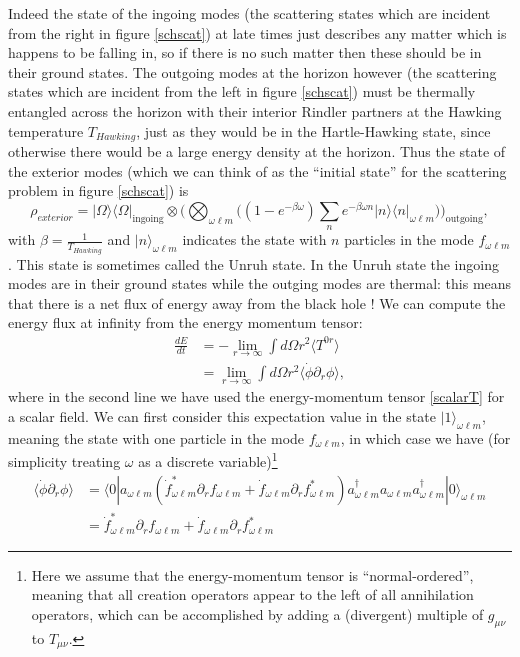 \documentclass[12pt]{article}
\newcommand{\be}{\begin{equation}}
\newcommand{\ee}{\end{equation}}
\newcommand{\lan}{\langle}
\newcommand{\ran}{\rangle}
\begin{document}
Indeed the state of the ingoing modes (the scattering states which are incident from the right in figure \ref{schscat}) at late times just describes any matter which is happens to be falling in, so if there is no such matter then these should be in their ground states.  The outgoing modes at the horizon however (the scattering states which are incident from the left in figure \ref{schscat}) must be thermally entangled across the horizon with their interior Rindler partners at the Hawking temperature $T_{\mathit{Hawking}}$, just as they would be in the Hartle-Hawking state, since otherwise there would be a large energy density at the horizon.  Thus the state of the exterior modes (which we can think of as the ``initial state'' for the scattering problem in figure \ref{schscat}) is
\be\label{BHmodestate}
\rho_{\mathit{exterior}}=|\Omega\ran\lan\Omega|_{\mathrm{ingoing}}\otimes \biggl(\bigotimes_{\omega \ell m}\bigl((1-e^{-\beta \omega})\sum_ne^{-\beta \omega n}|n\ran\lan n|_{\omega \ell m}\bigr)\biggr)_{\mathrm{outgoing}},
\ee
with $\beta=\frac{1}{T_{\mathit{Hawking}}}$ and $|n\ran_{\omega \ell m}$ indicates the state with $n$ particles in the mode $f_{\omega \ell m}$.  This state is sometimes called the Unruh state.  In the Unruh state the ingoing modes are in their ground states while the outging modes are thermal: this means that there is a net flux of energy away from the black hole \cite{Hawking:1974sw}!  We can compute the energy flux at infinity from the energy momentum tensor:
\begin{align}\nonumber
\frac{dE}{dt}&=-\lim_{r\to\infty}\int d\Omega r^2 \lan T^{0r}\ran\\
&=\lim_{r\to\infty}\int d\Omega r^2\lan\dot{\phi}\partial_r \phi\ran,
\end{align}
where in the second line we have used the energy-momentum tensor \eqref{scalarT} for a scalar field.  We can first consider this expectation value in the state $|1\ran_{\omega \ell m}$, meaning the state with one particle in the mode $f_{\omega\ell m}$, in which case we have (for simplicity treating $\omega$ as a discrete variable)\footnote{Here we assume that the energy-momentum tensor is ``normal-ordered'', meaning that all creation operators appear to the left of all annihilation operators, which can be accomplished by adding a (divergent) multiple of $g_{\mu\nu}$ to $T_{\mu\nu}$.}
\begin{align}\nonumber
\lan \dot{\phi}\partial_r \phi\ran &=\lan 0|a_{\omega \ell m}\left(\dot{f}_{\omega\ell m}^*\partial_r f_{\omega\ell m}+\dot{f}_{\omega\ell m}\partial_r f^*_{\omega\ell m}\right)a^\dagger_{\omega\ell m} a_{\omega\ell m}a^\dagger_{\omega\ell m}|0\ran_{\omega\ell m}\\
&=\dot{f}_{\omega\ell m}^*\partial_r f_{\omega\ell m}+\dot{f}_{\omega\ell m}\partial_r f^*_{\omega\ell m}
\end{align}
\end{document}
